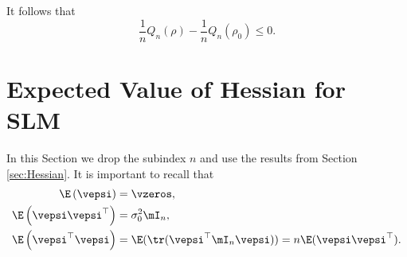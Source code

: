 \documentclass[english,12pt]{book}\usepackage[]{graphicx}\usepackage[]{xcolor}
\begin{document}
\begin{subappendices}
It follows that 
\begin{equation*}
\frac{1}{n}Q_n(\rho) - \frac{1}{n}Q_n(\rho_0) \leq 0.
\end{equation*}








 \section{Expected Value of Hessian for SLM}\label{appendix-EH-sml}

In this Section we drop the subindex $n$ and use the results from Section \ref{sec:Hessian}. It is important to recall that
\begin{align*}
	\E\left(\vepsi\right)      & = \vzeros, \\
	\E\left(\vepsi\vepsi^\top\right) &= \sigma^2_0\mI_n, \\
	\E\left(\vepsi^\top\vepsi\right) &= \E(\tr(\vepsi^\top\mI_n\vepsi)) = n\E(\vepsi\vepsi^\top).
\end{align*}


\end{subappendices}
\end{document}
